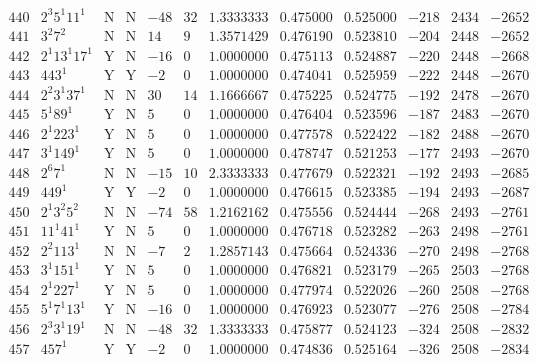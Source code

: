\documentclass[11pt,reqno,a4letter]{article}
\numberwithin{figure}{section}
\numberwithin{table}{section}
\theoremstyle{plain}
\numberwithin{theorem}{section}
\theoremstyle{definition}
\begin{document}
\begin{table}[ht]
\begin{equation*}
{\begin{array}{cc|cc|ccc|cc|ccc}
 440 & 2^3 5^1 11^1 & \text{N} & \text{N} & -48 & 32 & 1.3333333 & 0.475000 & 0.525000 & -218 & 2434 & -2652 \\
 441 & 3^2 7^2 & \text{N} & \text{N} & 14 & 9 & 1.3571429 & 0.476190 & 0.523810 & -204 & 2448 & -2652 \\
 442 & 2^1 13^1 17^1 & \text{Y} & \text{N} & -16 & 0 & 1.0000000 & 0.475113 & 0.524887 & -220 & 2448 & -2668 \\
 443 & 443^1 & \text{Y} & \text{Y} & -2 & 0 & 1.0000000 & 0.474041 & 0.525959 & -222 & 2448 & -2670 \\
 444 & 2^2 3^1 37^1 & \text{N} & \text{N} & 30 & 14 & 1.1666667 & 0.475225 & 0.524775 & -192 & 2478 & -2670 \\
 445 & 5^1 89^1 & \text{Y} & \text{N} & 5 & 0 & 1.0000000 & 0.476404 & 0.523596 & -187 & 2483 & -2670 \\
 446 & 2^1 223^1 & \text{Y} & \text{N} & 5 & 0 & 1.0000000 & 0.477578 & 0.522422 & -182 & 2488 & -2670 \\
 447 & 3^1 149^1 & \text{Y} & \text{N} & 5 & 0 & 1.0000000 & 0.478747 & 0.521253 & -177 & 2493 & -2670 \\
 448 & 2^6 7^1 & \text{N} & \text{N} & -15 & 10 & 2.3333333 & 0.477679 & 0.522321 & -192 & 2493 & -2685 \\
 449 & 449^1 & \text{Y} & \text{Y} & -2 & 0 & 1.0000000 & 0.476615 & 0.523385 & -194 & 2493 & -2687 \\
 450 & 2^1 3^2 5^2 & \text{N} & \text{N} & -74 & 58 & 1.2162162 & 0.475556 & 0.524444 & -268 & 2493 & -2761 \\
 451 & 11^1 41^1 & \text{Y} & \text{N} & 5 & 0 & 1.0000000 & 0.476718 & 0.523282 & -263 & 2498 & -2761 \\
 452 & 2^2 113^1 & \text{N} & \text{N} & -7 & 2 & 1.2857143 & 0.475664 & 0.524336 & -270 & 2498 & -2768 \\
 453 & 3^1 151^1 & \text{Y} & \text{N} & 5 & 0 & 1.0000000 & 0.476821 & 0.523179 & -265 & 2503 & -2768 \\
 454 & 2^1 227^1 & \text{Y} & \text{N} & 5 & 0 & 1.0000000 & 0.477974 & 0.522026 & -260 & 2508 & -2768 \\
 455 & 5^1 7^1 13^1 & \text{Y} & \text{N} & -16 & 0 & 1.0000000 & 0.476923 & 0.523077 & -276 & 2508 & -2784 \\
 456 & 2^3 3^1 19^1 & \text{N} & \text{N} & -48 & 32 & 1.3333333 & 0.475877 & 0.524123 & -324 & 2508 & -2832 \\
 457 & 457^1 & \text{Y} & \text{Y} & -2 & 0 & 1.0000000 & 0.474836 & 0.525164 & -326 & 2508 & -2834 \\

\end{array}}
\end{equation*}
\end{table}
\end{document}
